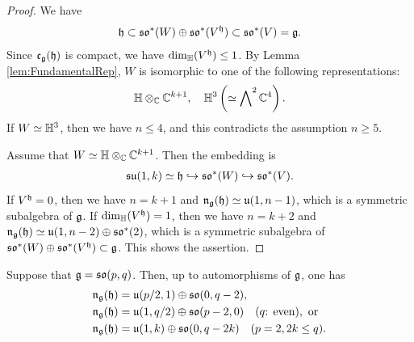 \begin{proof}
	We have
	\begin{align*}
		\mathfrak{h} \subset \mathfrak{so}^*(W) \oplus \mathfrak{so}^*(V^{\mathfrak{h}}) \subset \mathfrak{so}^*(V) = \mathfrak{g}.
	\end{align*}
	Since $\mathfrak{c}_{\mathfrak{g}}(\mathfrak{h})$ is compact, we have $\dim_{\mathbb{H}}(V^{\mathfrak{h}}) \leq 1$.
	By Lemma \ref{lem:FundamentalRep}, $W$ is isomorphic to one of the following representations:
	\begin{align*}
		\mathbb{H}\otimes_{\mathbb{C}} \mathbb{C}^{k+1}, \quad \mathbb{H}^3 \left(\simeq \bigwedge\nolimits^2 \mathbb{C}^4 \right).
	\end{align*}
	If $W \simeq \mathbb{H}^3$, then we have $n \leq 4$, and this contradicts the assumption $n \geq 5$.

	Assume that $W \simeq \mathbb{H}\otimes_{\mathbb{C}} \mathbb{C}^{k+1}$.
	Then the embedding is
	\begin{align*}
		\mathfrak{su}(1, k) \simeq \mathfrak{h} \hookrightarrow \mathfrak{so}^*(W) \hookrightarrow \mathfrak{so}^*(V).
	\end{align*}
	If $V^{\mathfrak{h}} = 0$, then we have $n=k+1$ and $\mathfrak{n}_{\mathfrak{g}}(\mathfrak{h}) \simeq \mathfrak{u}(1, n-1)$, which is a symmetric subalgebra of $\mathfrak{g}$.
	If $\dim_{\mathbb{H}}(V^{\mathfrak{h}}) = 1$, then we have $n = k+2$ and $\mathfrak{n}_{\mathfrak{g}}(\mathfrak{h}) \simeq \mathfrak{u}(1, n-2) \oplus \mathfrak{so}^*(2)$, which is a symmetric subalgebra of $\mathfrak{so}^*(W) \oplus \mathfrak{so}^*(V^{\mathfrak{h}})\subset \mathfrak{g}$.
	This shows the assertion.
\end{proof}

\begin{lemma} \label{lem:EmbeddingSUtoSO}
	Suppose that $\mathfrak{g} = \mathfrak{so}(p, q)$.
	Then, up to automorphisms of $\mathfrak{g}$, one has
	\begin{align*}
		\mathfrak{n}_{\mathfrak{g}}(\mathfrak{h}) &= \mathfrak{u}(p/2, 1) \oplus \mathfrak{so}(0, q - 2),  \\
		\mathfrak{n}_{\mathfrak{g}}(\mathfrak{h}) &= \mathfrak{u}(1, q/2) \oplus \mathfrak{so}(p - 2, 0) \quad (q\text{: even}), \text{ or } \\
		\mathfrak{n}_{\mathfrak{g}}(\mathfrak{h}) &= \mathfrak{u}(1, k) \oplus \mathfrak{so}(0, q - 2k) \quad (p=2, 2k \leq q).
	\end{align*}
\end{lemma}

